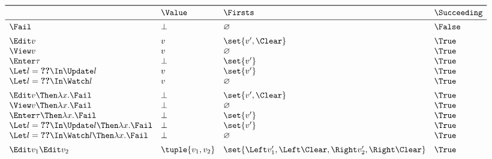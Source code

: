 \begin{equation*}
  \begin{array}{llll}
    \toprule
                                                         & \Value           & \Firsts                                                    & \Succeeding \\
    \midrule
    \Fail                                                & \bot             & \nothing                                                   & \False \\
    \addlinespace
    \Edit v                                              & v                & \set{v', \Clear}                                           & \True \\
    \View v                                              & v                & \nothing                                                   & \True \\
    \Enter \tau                                          & \bot             & \set{v'}                                                   & \True \\
    \Let l = \Ref v \In \Update l                        & v                & \set{v'}                                                   & \True \\
    \Let l = \Ref v \In \Watch l                         & v                & \nothing                                                   & \True \\
    \addlinespace
    \Edit v \Then \lambda x. \Fail                       & \bot             & \set{v', \Clear}                                           & \True \\
    \View v \Then \lambda x. \Fail                       & \bot             & \nothing                                                   & \True \\
    \Enter \tau \Then \lambda x. \Fail                   & \bot             & \set{v'}                                                   & \True \\
    \Let l = \Ref v \In \Update l \Then \lambda x. \Fail & \bot             & \set{v'}                                                   & \True \\
    \Let l = \Ref v \In \Watch l \Then \lambda x. \Fail  & \bot             & \nothing                                                   & \True \\
    \addlinespace
    \Edit v_1 \And \Edit v_2                             & \tuple{v_1, v_2} & \set{\Left v_1', \Left \Clear, \Right v_2', \Right \Clear} & \True \\

\end{array}
\end{equation*}
